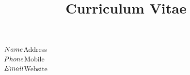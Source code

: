 \documentclass{cv}
\title{Curriculum Vitae}
\begin{document}
    \begin{info}$Name \\
                $Address \\
                $Phone \\
                $Mobile \\
                $Email \\
                $Website
    \end{info}
\end{document}
